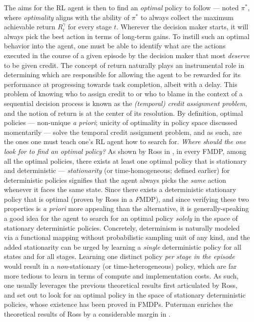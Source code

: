 The aims for the RL agent is then to find an \emph{optimal} policy to follow --- noted $\pi^*$, where
\emph{optimality} aligns with the ability of $\pi^*$ to always collect the maximum achievable return
$R_t^\gamma$ for every stage $t$.
Wherever the decision maker starts, it will always pick the best action in terms of long-term gains.
To instill such an optimal behavior into the agent, one must be able to identify what are the actions
executed in the course of a given episode by the decision maker that most \emph{deserve} to be given credit.
The concept of return naturally plays an instrumental role in determining which are responsible for allowing the
agent to be rewarded for its performance at progressing towards task completion, albeit with a delay.
This problem of knowing who to assign credit to or who to blame
in the context of a sequential decision process
is known as the \emph{(temporal) credit assignment problem}, and the notion of return is at the center
of its resolution.
By definition, optimal policies --- non-unique \textit{a priori}; unicity of optimality in policy space
discussed momentarily --- solve the temporal credit assignment problem, and as such, are the ones
one must teach one's RL agent how to search for.
\emph{Where should the one look for to find an optimal policy?}
As shown by Ross in \cite{Ross1983-oc},
in every FMDP, among all the optimal policies,
there exists at least one optimal policy that is stationary and deterministic
--- \textit{stationarity} (or time-homogeneous; defined earlier)
for deterministic policies signifies that the agent always picks the \emph{same}
action whenever it faces the same state.
Since there exists a deterministic stationary policy that is optimal (proven by Ross in a \emph{F}MDP),
and since verifying these two properties is \textit{a priori} more appealing than the alternative,
it is generally-speaking a good idea for the agent to search for an optimal policy \emph{solely} in the
space of stationary deterministic policies.
Concretely, determinism is naturally modeled via a functional mapping without probabilistic sampling unit of any
kind, and the added stationarity can be urged by learning a \emph{single}
deterministic policy for all states and for all stages.
Learning one distinct policy \emph{per stage in the episode} would result in a \textit{non}-stationary
(or time-heterogeneous) policy, which are far more tedious to learn in terms of compute and implementation costs.
As such, one usually leverages the previous theoretical results first articulated by Ross,
and set out to look for an optimal policy in the space of stationary deterministic policies,
whose existence has been proved in FMDPs.
Puterman enriches the theoretical results of Ross by a considerable margin in \cite{Puterman1994-pf}.


